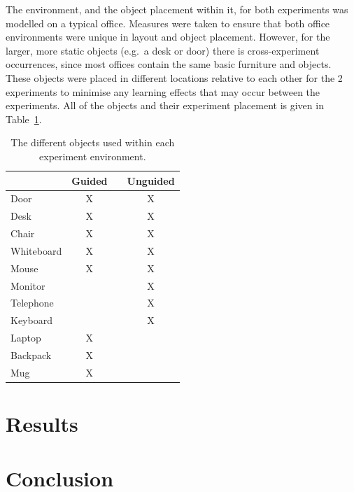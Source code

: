 \documentclass[runningheads]{llncs}
\begin{document}
The environment, and the object placement within it, for both experiments was modelled on a typical office.
Measures were taken to ensure that both office environments were unique in layout and object placement. 
However, for the larger, more static objects (e.g.\ a desk or door) there is cross-experiment occurrences, since most offices contain the same basic furniture and objects. 
These objects were placed in different locations relative to each other for the 2 experiments to minimise any learning effects that may occur between the experiments. 
All of the objects and their experiment placement is given in Table~\ref{tab:objects}.

\begin{table}
  \centering
  \caption{The different objects used within each experiment environment.}\label{tab:objects}
  \begin{tabular}{p{2cm}cp{0.7cm}c}
    \toprule
    & \bf{Guided} & & \bf{Unguided} \\\midrule
    Door        & X & & X \\\midrule
    Desk	& X & & X \\\midrule
    Chair	& X & & X \\\midrule
    Whiteboard	& X & & X \\\midrule
    Mouse	& X & & X \\\midrule
    Monitor	&   & & X \\\midrule
    Telephone	&   & & X \\\midrule
    Keyboard	&   & & X \\\midrule
    Laptop	& X & &   \\\midrule
    Backpack	& X & &   \\\midrule
    Mug		& X & &   \\\midrule
    \bottomrule
  \end{tabular}
\end{table}

\section{Results}

\section{Conclusion}



\end{document}
